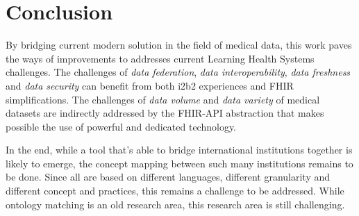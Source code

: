 \documentclass{amia}
\begin{document}
\section*{Conclusion}

By bridging current modern solution in the field of medical data, this work paves the ways of improvements to addresses current Learning Health Systems challenges.
The challenges of \textit{data federation}, \textit{data interoperability}, \textit{data freshness} and \textit{data security} can benefit from both i2b2 experiences and 
FHIR simplifications.
The challenges of \textit{data volume} and \textit{data variety} of medical datasets are indirectly addressed by the FHIR-API abstraction that makes possible the use of 
powerful and dedicated technology.

In the end, while a tool that's able to bridge international institutions together is likely to emerge, the concept mapping between such many institutions remains to be done. Since all are based on different languages, different granularity and different concept and practices, this remains a challenge to be addressed. While ontology matching is an old research area, this research area is still challenging.



\makeatletter
\renewcommand{\@biblabel}[1]{\hfill #1.}
\makeatother
\end{document}
